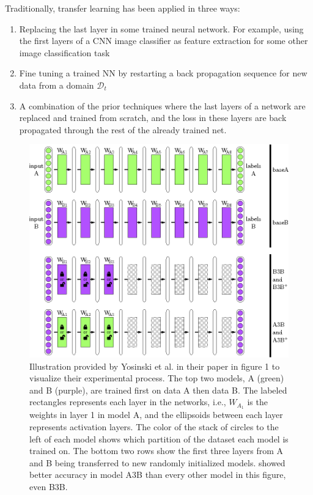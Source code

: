 Traditionally, transfer learning has been applied in three ways: 
\begin{enumerate}  
    \item Replacing the last layer in some trained neural network. For example, using the first layers of a CNN image classifier as feature extraction for some other image classification task 
    \item Fine tuning a trained NN by restarting a back propagation sequence for new data from a domain \(\mathcal{D}_{t}\)
    \item A combination of the prior techniques where the last layers of a network are replaced and trained from scratch, and the loss in these layers are back propagated through the rest of the already trained net.
\end{enumerate}


\begin{figure}[h] 
    \centering
    \includegraphics[width=\linewidth]{Chapters/2.Background/figures/transfer_experiment.png}
    \caption[Transfer learning experiment]{Illustration provided by Yosinski et al. in their paper\cite{yosinski2014transferable} in figure 1 to visualize their experimental process. The top two models, A (green) and B (purple), are trained first on data A then data B. The labeled rectangles represents each layer in the networks, i.e., \(W_{A_{1}}\) is the weights in layer 1 in model A, and the ellipsoids between each layer represents activation layers. The color of the stack of circles to the left of each model shows which partition of the dataset each model is trained on. The bottom two rows show the first three layers from A and B being transferred to new randomly initialized models. \cite{yosinski2014transferable} showed better accuracy in model A3B than every other model in this figure, even B3B.}
    \label{fig:transferexperiment}
\end{figure}

